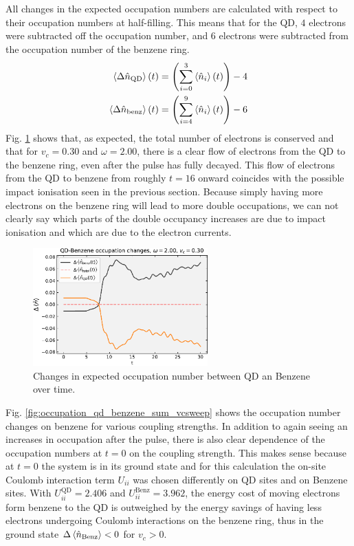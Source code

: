 All changes in the expected occupation numbers are calculated with respect to their occupation numbers at half-filling. This means that for the QD, $4$ electrons were subtracted off the occupation number, and $6$ electrons were subtracted from the occupation number of the benzene ring.
%
\begin{equation}
    \begin{split}
        \braket{\Delta\hat{n}_{\text{QD}}}(t) = \left(\sum_{i=0}^3 \braket{\hat{n}_i}(t) \right) - 4\\
        \braket{\Delta\hat{n}_{\text{benz}}}(t) = \left(\sum_{i=4}^9 \braket{\hat{n}_i}(t) \right) - 6
    \end{split}
\end{equation}
%
Fig. \ref{fig:occupation_sum_w_2_vc_03} shows that, as expected, the total number of electrons is conserved and that for $v_c=0.30$ and $\omega=2.00$, there is a clear flow of electrons from the QD to the benzene ring, even after the pulse has fully decayed. This flow of electrons from the QD to benzene from roughly $t=16$ onward coincides with the possible impact ionisation seen in the previous section. Because simply having more electrons on the benzene ring will lead to more double occupations, we can not clearly say which parts of the double occupancy increases are due to impact ionisation and which are due to the electron currents.

\begin{figure}[!hbt]
    \centering
    \includegraphics[width=0.6\textwidth]{graph/occupation/occupation_w2_03_sum.pdf}
    \caption{Changes in expected occupation number between QD an Benzene over time.}
    \label{fig:occupation_sum_w_2_vc_03}
\end{figure}


Fig. \ref{fig:occupation_qd_benzene_sum_vcsweep} shows the occupation number changes on benzene for various coupling strengths. In addition to again seeing an increases in occupation after the pulse, there is also clear dependence of the occupation numbers at $t=0$ on the coupling strength. This makes sense because at $t=0$ the system is in its ground state and for this calculation the on-site Coulomb interaction term $U_{ii}$ was chosen differently on QD sites and on Benzene sites. With $U_{ii}^{\text{QD}} = 2.406$ and $U_{ii}^{\text{Benz}} = 3.962$, the energy cost of moving electrons form benzene to the QD is outweighed by the energy savings of having less electrons undergoing Coulomb interactions on the benzene ring, thus in the ground state $\Delta \braket{\hat{n}_{\text{Benz}}} < 0$ for $v_c > 0$.

